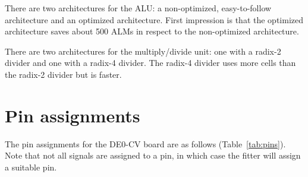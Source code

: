 \documentclass[12pt]{article}
\begin{document}
There are two architectures for the ALU: a non-optimized, easy-to-follow architecture and an optimized architecture. First impression is that the optimized architecture saves about 500 ALMs in respect to the non-optimized architecture.

There are two architectures for the multiply/divide unit: one with a radix-2 divider and one with a radix-4 divider. The radix-4 divider uses more cells than the radix-2 divider but is faster.

\section{Pin assignments}
The pin assignments for the DE0-CV board are as follows (Table~\ref{tab:pins}). Note that not all signals are assigned to a pin, in which case the fitter will assign a suitable pin.
\end{document}
